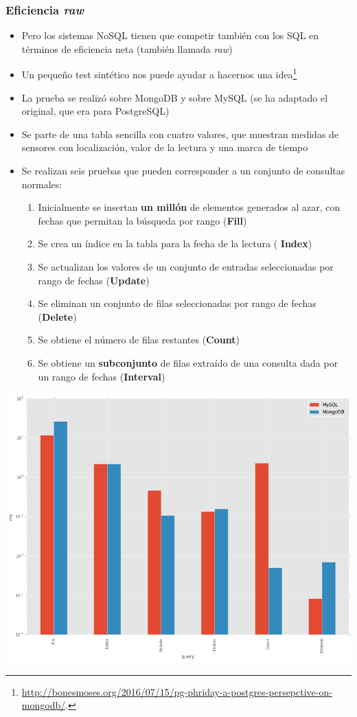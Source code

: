 \documentclass[14pt]{beamer}
\begin{document}
\begin{frame}[allowframebreaks]
  \frametitle{Eficiencia {\em raw}}
  \begin{itemize}
  \item Pero los sistemas NoSQL tienen que competir también con los SQL en
    términos de eficiencia neta (también llamada {\em raw})
  \item Un pequeño test sintético nos puede ayudar a hacernos una
    idea\footnote{\url{http://bonesmoses.org/2016/07/15/pg-phriday-a-postgres-persepctive-on-mongodb/}.}

\item La prueba se realizó sobre MongoDB y sobre MySQL (se ha adaptado el
  original, que era para PostgreSQL)

  \framebreak

\item Se parte de una tabla sencilla con cuatro valores, que muestran
  medidas de sensores con localización, valor de la lectura y una marca de
  tiempo
  \item Se realizan seis pruebas que pueden corresponder a un conjunto de
    consultas normales:
\framebreak
  \begin{enumerate}
  \item Inicialmente se insertan {\bf un millón} de elementos generados al
    azar, con fechas que permitan la búsqueda por rango ({\bf Fill})
  \item Se crea un índice en la tabla para la fecha de la lectura ({\bf
      Index})
  \item Se actualizan los valores de un conjunto de entradas seleccionadas
    por rango de fechas ({\bf Update})
  \item Se eliminan un conjunto de filas seleccionadas por rango de fechas
    ({\bf Delete})
  \item Se obtiene el número de filas restantes ({\bf Count})
  \item Se obtiene un {\bf subconjunto} de filas extraído de una consulta
    dada por un rango de fechas ({\bf Interval})
  \end{enumerate}

\end{itemize}

\begin{center}
\includegraphics[width=.9\textwidth]{img/mongo_vs_mysql}
\end{center}



\end{frame}
\end{document}
